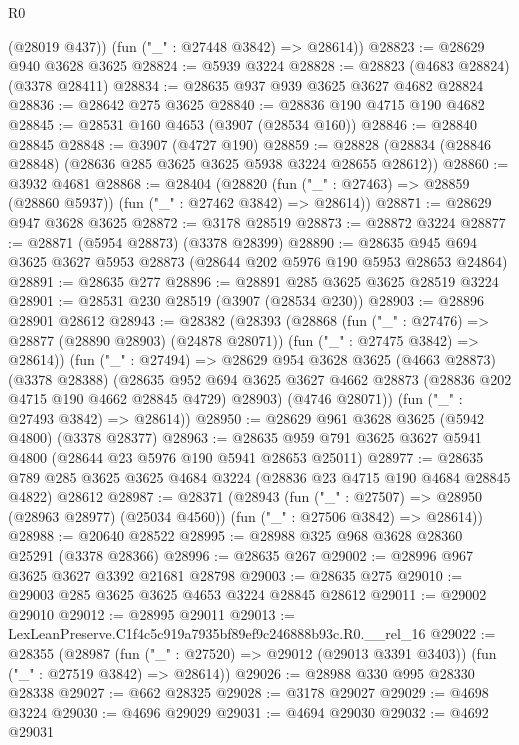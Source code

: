 \begin{lexlean}{R0}
\begin{coremodule}
        (@28019 @437))
      (fun ("_" : @27448 @3842) => @28614))
@28823 := @28629 @940 @3628 @3625
@28824 := @5939 @3224
@28828 := @28823 (@4683 @28824) (@3378 @28411)
@28834 := @28635 @937 @939 @3625 @3627 @4682 @28824
@28836 := @28642 @275 @3625
@28840 := @28836 @190 @4715 @190 @4682
@28845 := @28531 @160 @4653 (@3907 (@28534 @160))
@28846 := @28840 @28845
@28848 := @3907 (@4727 @190)
@28859 := @28828 (@28834 (@28846 @28848) (@28636 @285 @3625 @3625 @5938 @3224 @28655 @28612))
@28860 := @3932 @4681
@28868 := @28404
    (@28820 (fun ("_" : @27463) => @28859 (@28860 @5937)) (fun ("_" : @27462 @3842) => @28614))
@28871 := @28629 @947 @3628 @3625
@28872 := @3178 @28519
@28873 := @28872 @3224
@28877 := @28871 (@5954 @28873) (@3378 @28399)
@28890 := @28635 @945 @694 @3625 @3627 @5953 @28873 (@28644 @202 @5976 @190 @5953 @28653 @24864)
@28891 := @28635 @277
@28896 := @28891 @285 @3625 @3625 @28519 @3224
@28901 := @28531 @230 @28519 (@3907 (@28534 @230))
@28903 := @28896 @28901 @28612
@28943 := @28382
    (@28393
      (@28868
        (fun ("_" : @27476) => @28877 (@28890 @28903) (@24878 @28071))
        (fun ("_" : @27475 @3842) => @28614))
      (fun ("_" : @27494) =>
      @28629
        @954
        @3628
        @3625
        (@4663 @28873)
        (@3378 @28388)
        (@28635
          @952
          @694
          @3625
          @3627
          @4662
          @28873
          (@28836 @202 @4715 @190 @4662 @28845 @4729)
          @28903)
        (@4746 @28071))
      (fun ("_" : @27493 @3842) => @28614))
@28950 := @28629 @961 @3628 @3625 (@5942 @4800) (@3378 @28377)
@28963 := @28635 @959 @791 @3625 @3627 @5941 @4800 (@28644 @23 @5976 @190 @5941 @28653 @25011)
@28977 := @28635 @789 @285 @3625 @3625 @4684 @3224 (@28836 @23 @4715 @190 @4684 @28845 @4822) @28612
@28987 := @28371
    (@28943
      (fun ("_" : @27507) => @28950 (@28963 @28977) (@25034 @4560))
      (fun ("_" : @27506 @3842) => @28614))
@28988 := @20640 @28522
@28995 := @28988 @325 @968 @3628 @28360 @25291 (@3378 @28366)
@28996 := @28635 @267
@29002 := @28996 @967 @3625 @3627 @3392 @21681 @28798
@29003 := @28635 @275
@29010 := @29003 @285 @3625 @3625 @4653 @3224 @28845 @28612
@29011 := @29002 @29010
@29012 := @28995 @29011
@29013 := LexLeanPreserve.C1f4c5c919a7935bf89ef9c246888b93c.R0.__rel_16
@29022 := @28355
    (@28987
      (fun ("_" : @27520) => @29012 (@29013 @3391 @3403))
      (fun ("_" : @27519 @3842) => @28614))
@29026 := @28988 @330 @995 @28330 @28338
@29027 := @662 @28325
@29028 := @3178 @29027
@29029 := @4698 @3224
@29030 := @4696 @29029
@29031 := @4694 @29030
@29032 := @4692 @29031

\end{coremodule}
\end{lexlean}
